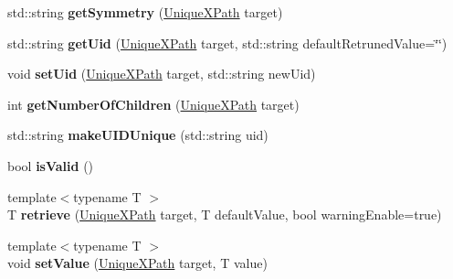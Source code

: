 \begin{DoxyCompactItemize}
\item 
\hypertarget{classcpcr_1_1CPACSFile_af8b5a01906f8de6bd09e36d556b52309}{std\-::string {\bfseries get\-Symmetry} (\hyperlink{classcpcr_1_1UniqueXPath}{Unique\-X\-Path} target)}\label{classcpcr_1_1CPACSFile_af8b5a01906f8de6bd09e36d556b52309}

\item 
\hypertarget{classcpcr_1_1CPACSFile_aea30e211f2850d653b74d6e3cc82466b}{std\-::string {\bfseries get\-Uid} (\hyperlink{classcpcr_1_1UniqueXPath}{Unique\-X\-Path} target, std\-::string default\-Retruned\-Value=\char`\"{}\char`\"{})}\label{classcpcr_1_1CPACSFile_aea30e211f2850d653b74d6e3cc82466b}

\item 
\hypertarget{classcpcr_1_1CPACSFile_af65501ea5bc1ee3be33adced509e1655}{void {\bfseries set\-Uid} (\hyperlink{classcpcr_1_1UniqueXPath}{Unique\-X\-Path} target, std\-::string new\-Uid)}\label{classcpcr_1_1CPACSFile_af65501ea5bc1ee3be33adced509e1655}

\item 
\hypertarget{classcpcr_1_1CPACSFile_acb57418a63140514c09af489f09e9433}{int {\bfseries get\-Number\-Of\-Children} (\hyperlink{classcpcr_1_1UniqueXPath}{Unique\-X\-Path} target)}\label{classcpcr_1_1CPACSFile_acb57418a63140514c09af489f09e9433}

\item 
\hypertarget{classcpcr_1_1CPACSFile_ab724f43738e12bc3f7eefb00c9bc4eda}{std\-::string {\bfseries make\-U\-I\-D\-Unique} (std\-::string uid)}\label{classcpcr_1_1CPACSFile_ab724f43738e12bc3f7eefb00c9bc4eda}

\item 
\hypertarget{classcpcr_1_1CPACSFile_a9a06da395f47b25850015d910bc17828}{bool {\bfseries is\-Valid} ()}\label{classcpcr_1_1CPACSFile_a9a06da395f47b25850015d910bc17828}

\item 
\hypertarget{classcpcr_1_1CPACSFile_a26ed94223654efb1a23789973a15ccc9}{{\footnotesize template$<$typename T $>$ }\\T {\bfseries retrieve} (\hyperlink{classcpcr_1_1UniqueXPath}{Unique\-X\-Path} target, T default\-Value, bool warning\-Enable=true)}\label{classcpcr_1_1CPACSFile_a26ed94223654efb1a23789973a15ccc9}

\item 
\hypertarget{classcpcr_1_1CPACSFile_af94df9766a9e41a3d88a9fe7f1dddeeb}{{\footnotesize template$<$typename T $>$ }\\void {\bfseries set\-Value} (\hyperlink{classcpcr_1_1UniqueXPath}{Unique\-X\-Path} target, T value)}\label{classcpcr_1_1CPACSFile_af94df9766a9e41a3d88a9fe7f1dddeeb}

\end{DoxyCompactItemize}
